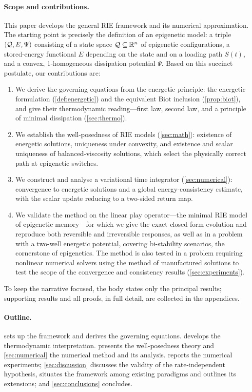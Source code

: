 \paragraph{Scope and contributions.}
This paper develops the general RIE framework and its numerical
approximation. The starting point is precisely the definition of an epigenetic model: a triple $(\mathcal{Q},E,\Psi)$ consisting of a state space
$\mathcal{Q}\subseteq\mathbb{R}^n$ of epigenetic configurations, a stored-energy
functional $E$ depending on the state and on a loading path $S(t)$, and
a convex, $1$-homogeneous dissipation potential $\Psi$. Based on this succinct postulate, our contributions are:
\begin{enumerate}[leftmargin=2em,itemsep=2pt]
  \item We derive the governing equations from the energetic principle:
  the energetic formulation (\cref{def:energetic}) and the equivalent
  Biot inclusion (\cref{prop:biot}), and give their thermodynamic
  reading---first law, second law, and a principle of minimal
  dissipation (\cref{sec:thermo}).
  \item We establish the well-posedness of RIE models
  (\cref{sec:math}): existence of energetic solutions, uniqueness under
  convexity, and existence and scalar uniqueness of balanced-viscosity
  solutions, which select the physically correct path at epigenetic
  switches.
  \item We construct and analyse a variational time integrator
  (\cref{sec:numerical}): convergence to energetic solutions and a
  global energy-consistency estimate, with the scalar update reducing
  to a two-sided return map.
  \item We validate the method on the linear play operator---the
  minimal RIE model of epigenetic memory---for which we give the exact
  closed-form evolution and reproduce both reversible and irreversible
  responses, as well as in a problem with a two-well energetic potential, covering bi-stability scenarios, the cornerstone of epigenetics. The method is also tested in a problem requiring nonlinear numerical solvers using the method of manufactured solutions to test the scope of the convergence and consistency results (\cref{sec:experiments}).
\end{enumerate}
To keep the narrative focused, the body states only the principal
results; supporting results and all proofs, in full detail, are
collected in the appendices.

\paragraph{Outline.}
 sets up the framework and derives the governing
equations.  develops the thermodynamic interpretation.
 presents the well-posedness theory and
\cref{sec:numerical} the numerical method and its analysis.
 reports the numerical experiments;
\cref{sec:discussion} discusses the validity of the rate-independent
hypothesis, situates the framework among existing paradigms and
outlines its extensions; and \cref{sec:conclusions} concludes.
